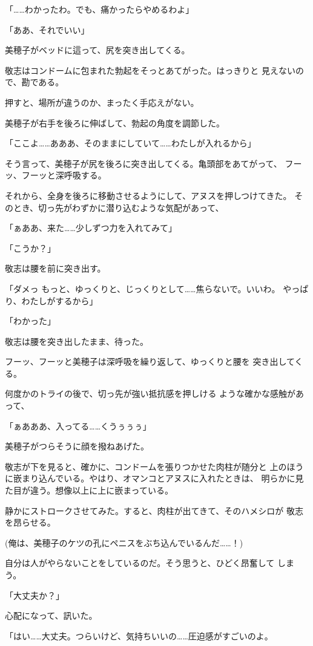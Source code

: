 ﻿\documentclass[
    book,tate,
    line_length=30zw,
    jafontsize=12pt,
    paper=b5j,
    landscape,
    ]{jlreq}
\begin{document}
「……わかったわ。でも、痛かったらやめるわよ」

「ああ、それでいい」

美穂子がベッドに這って、尻を突き出してくる。

敬志はコンドームに包まれた勃起をそっとあてがった。はっきりと
見えないので、勘である。

押すと、場所が違うのか、まったく手応えがない。

美穂子が右手を後ろに伸ばして、勃起の角度を調節した。

「ここよ……あああ、そのままにしていて……わたしが入れるから」

そう言って、美穂子が尻を後ろに突き出してくる。亀頭部をあてがって、
フーッ、フーッと深呼吸する。

それから、全身を後ろに移動させるようにして、アヌスを押しつけてきた。
そのとき、切っ先がわずかに潜り込むような気配があって、

「ぁああ、来た……少しずつ力を入れてみて」

「こうか？」

敬志は腰を前に突き出す。

「ダメっ もっと、ゆっくりと、じっくりとして……焦らないで。いいわ。
やっぱり、わたしがするから」

「わかった」

敬志は腰を突き出したまま、待った。

フーッ、フーッと美穂子は深呼吸を繰り返して、ゆっくりと腰を
突き出してくる。

何度かのトライの後で、切っ先が強い抵抗感を押しける
ような確かな感触があって、

「ぁあああ、入ってる……くうぅぅぅ」

美穂子がつらそうに顔を撥ねあげた。

敬志が下を見ると、確かに、コンドームを張りつかせた肉柱が随分と
上のほうに嵌まり込んでいる。やはり、オマンコとアヌスに入れたときは、
明らかに見た目が違う。想像以上に上に嵌まっている。

静かにストロークさせてみた。すると、肉柱が出てきて、そのハメシロが
敬志を昂らせる。

(俺は、美穂子のケツの孔にペニスをぶち込んでいるんだ……！)

自分は人がやらないことをしているのだ。そう思うと、ひどく昂奮して
しまう。

「大丈夫か？」

心配になって、訊いた。

「はい……大丈夫。つらいけど、気持ちいいの……圧迫感がすごいのよ。
\end{document}
